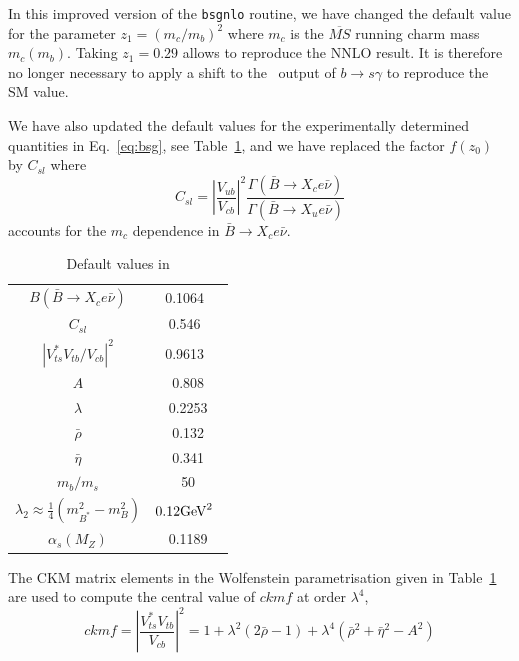 \documentclass[12pt,a4paper]{article}
\begin{document}
 In this improved version of the {\tt bsgnlo} routine, we 
 have changed the default value for the parameter $z_1=(m_c/m_b)^2$
 where $m_c$ is the $\overline{MS}$ running charm mass $m_c(m_b)$. Taking $z_1=0.29$ allows 
 to reproduce the NNLO result. 
 It is therefore no longer necessary to apply a shift to  the \micro\ output of $b\rightarrow s\gamma$
 to reproduce the SM value. 


We have also updated the default values for the experimentally determined quantities in
Eq.~\ref{eq:bsg}, see Table~\ref{tab:def}, and we have replaced the factor $f(z_0)$ by $C_{sl}$ where
\begin{equation}
C_{sl}=\left|\frac{V_{ub}}{V_{cb}}\right|^2 \frac{\Gamma(\bar{B}\rightarrow X_c e\bar\nu)}{\Gamma(\bar{B}\rightarrow X_u e\bar\nu)}
\end{equation}
accounts for the $m_c$ dependence in $\bar{B}\rightarrow X_c e\bar\nu$.


\begin{table}[htbp]
\begin{center}
\begin{tabular}{|c|c|}
\hline
$B(\bar{B}\rightarrow X_c e\bar\nu)$ & 0.1064~\cite{Nakamura:2010zzi}\\
$C_{sl}$ & 0.546~\cite{Gambino:2008fj}\\
$|V_{ts}^*V_{tb}/V_{cb}|^2$ & 0.9613~\cite{Nakamura:2010zzi}\\
$A$& 0.808\\
$\lambda$ & 0.2253\\
$\bar{\rho}$ & 0.132\\
$\bar{\eta}$ &0.341 \\
$m_b/m_s$  & 50\\
$\lambda_2\approx \frac{1}{4} (m^2_{B^*}-m^2_B)$ &  $0.12 {\rm GeV}^2$~\cite{Yao:2006px}\\
$\alpha_s(M_Z)$ &0.1189 \\\hline
\end{tabular}
\caption{Default values in \micro }
\label{tab:def}
\end{center}
\end{table}

The CKM matrix elements in the Wolfenstein parametrisation given in Table~\ref{tab:def}
are used to compute the central value of $ckmf$  at order $\lambda^4$,
\begin{equation}
ckmf=\left|\frac{V_{ts}^*V_{tb}}{V_{cb}}\right|^2=1+\lambda^2 (2\bar{\rho}-1) +
\lambda^4 (\bar\rho^2+\bar\eta^2-A^2)
\end{equation}
\end{document}
